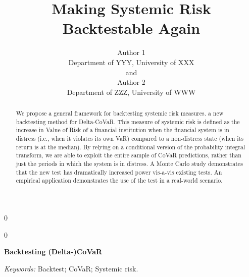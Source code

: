 \documentclass[12pt]{article}
\newcommand{\blind}{0}
\begin{document}
%

\def\spacingset#1{\renewcommand{\baselinestretch}%
{#1}\small\normalsize} \spacingset{1}



\blind
{
  \title{\bf Making Systemic Risk Backtestable Again}
  \author{Author 1\\
    Department of YYY, University of XXX\\
    and \\
    Author 2 \\
    Department of ZZZ, University of WWW}
  \maketitle
} \fi

\blind
{
  \bigskip
  \bigskip
  \bigskip
  \begin{center}
    {\LARGE\bf Backtesting (Delta-)CoVaR}
\end{center}
  \medskip
} \fi

\bigskip
\begin{abstract}
We propose a general framework for backtesting systemic risk measures. a new backtesting method for Delta-CoVaR. This measure of systemic risk is defined as the increase in Value of Risk of a financial institution when the financial system is in distress (i.e., when it violates its own VaR) compared to a non-distress state (when its return is at the median). By relying on a conditional version of the probability integral transform, we are able to exploit the entire sample of CoVaR predictions, rather than just the periods in which the system is in distress. A Monte Carlo study demonstrates that the new test has dramatically increased power vis-a-vis existing tests. An empirical application demonstrates the use of the test in a real-world scenario.
\end{abstract}
{\it Keywords:}  Backtest; CoVaR; Systemic risk.
\vfill
\end{document}
